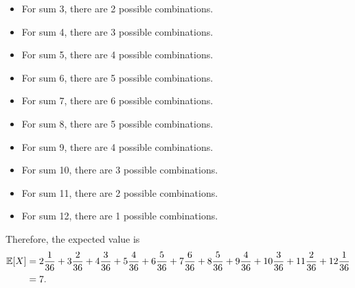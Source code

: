 \documentclass[letterpaper]{article}
\begin{document}
\begin{mdframed}
\begin{enumerate}
\begin{mdframed}
\begin{itemize}
                \item For sum 3, there are 2 possible combinations.
                \item For sum 4, there are 3 possible combinations.  
                \item For sum 5, there are 4 possible combinations. 
                \item For sum 6, there are 5 possible combinations. 
                \item For sum 7, there are 6 possible combinations. 
                \item For sum 8, there are 5 possible combinations. 
                \item For sum 9, there are 4 possible combinations. 
                \item For sum 10, there are 3 possible combinations. 
                \item For sum 11, there are 2 possible combinations. 
                \item For sum 12, there are 1 possible combinations. 
            \end{itemize}
            Therefore, the expected value is 
            \begin{equation*}
                \begin{aligned}
                    \mathbb{E}[X] &= 2 \frac{1}{36} + 3 \frac{2}{36} + 4 \frac{3}{36} + 5 \frac{4}{36} + 6 \frac{5}{36} + 7 \frac{6}{36} + 8 \frac{5}{36} + 9 \frac{4}{36} + 10 \frac{3}{36} + 11 \frac{2}{36} + 12 \frac{1}{36} \\ 
                        &= 7.
                \end{aligned}
            \end{equation*}
        \end{mdframed}
    \end{enumerate}
\end{mdframed}
\end{document}
